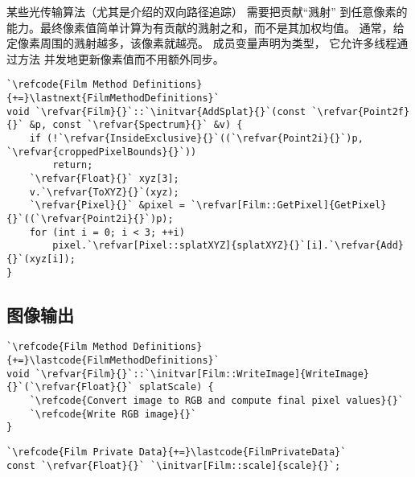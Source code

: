 某些光传输算法（尤其是介绍的双向路径追踪）
需要把贡献“溅射”
到任意像素的能力。最终像素值简单计算为有贡献的溅射之和，而不是其加权均值。
通常，给定像素周围的溅射越多，该像素就越亮。
成员变量声明为类型，
它允许多线程通过方法
并发地更新像素值而不用额外同步。
\begin{lstlisting}
`\refcode{Film Method Definitions}{+=}\lastnext{FilmMethodDefinitions}`
void `\refvar{Film}{}`::`\initvar{AddSplat}{}`(const `\refvar{Point2f}{}` &p, const `\refvar{Spectrum}{}` &v) {
    if (!`\refvar{InsideExclusive}{}`((`\refvar{Point2i}{}`)p, `\refvar{croppedPixelBounds}{}`))
        return;
    `\refvar{Float}{}` xyz[3];
    v.`\refvar{ToXYZ}{}`(xyz);
    `\refvar{Pixel}{}` &pixel = `\refvar[Film::GetPixel]{GetPixel}{}`((`\refvar{Point2i}{}`)p);
    for (int i = 0; i < 3; ++i)
        pixel.`\refvar[Pixel::splatXYZ]{splatXYZ}{}`[i].`\refvar{Add}{}`(xyz[i]);
}
\end{lstlisting}

\subsection{图像输出}\label{sub:图像输出}
\begin{lstlisting}
`\refcode{Film Method Definitions}{+=}\lastcode{FilmMethodDefinitions}`
void `\refvar{Film}{}`::`\initvar[Film::WriteImage]{WriteImage}{}`(`\refvar{Float}{}` splatScale) {
    `\refcode{Convert image to RGB and compute final pixel values}{}`
    `\refcode{Write RGB image}{}`
}
\end{lstlisting}
\begin{lstlisting}
`\refcode{Film Private Data}{+=}\lastcode{FilmPrivateData}`
const `\refvar{Float}{}` `\initvar[Film::scale]{scale}{}`;
\end{lstlisting}